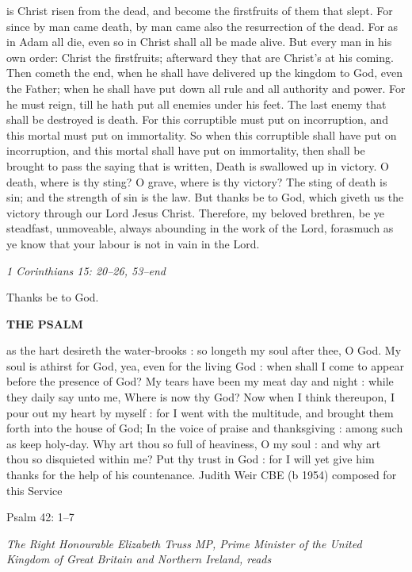  is Christ risen from the dead, and become the firstfruits of them that slept.
For since by man came death, by man came also the resurrection of the dead. For
as in Adam all die, even so in Christ shall all be made alive. But every man in his own
order: Christ the firstfruits; afterward they that are Christ’s at his coming. Then cometh
the end, when he shall have delivered up the kingdom to God, even the Father; when
he shall have put down all rule and all authority and power. For he must reign, till he
hath put all enemies under his feet. The last enemy that shall be destroyed is death. For
this corruptible must put on incorruption, and this mortal must put on immortality. So
when this corruptible shall have put on incorruption, and this mortal shall have put on
immortality, then shall be brought to pass the saying that is written, Death is swallowed
up in victory. O death, where is thy sting? O grave, where is thy victory? The sting of
death is sin; and the strength of sin is the law. But thanks be to God, which giveth us
the victory through our Lord Jesus Christ. Therefore, my beloved brethren, be ye
steadfast, unmoveable, always abounding in the work of the Lord, forasmuch as ye
know that your labour is not in vain in the Lord.

\hfill {\itshape\color{qred}1 Corinthians 15: 20–26, 53–end}

Thanks be to God.




\begin{center}
	\bfseries\color{qred} THE PSALM
\end{center}

 as the hart desireth the water-brooks : so longeth my soul after thee, O God.
My soul is athirst for God, yea, even for the living God : when shall I come to
appear before the presence of God?
My tears have been my meat day and night : while they daily say unto me, Where is
now thy God?
Now when I think thereupon, I pour out my heart by myself : for I went with the
multitude, and brought them forth into the house of God;
In the voice of praise and thanksgiving : among such as keep holy-day.
Why art thou so full of heaviness, O my soul : and why art thou so disquieted within
me?
Put thy trust in God : for I will yet give him thanks for the help of his countenance.
Judith Weir CBE (b 1954)
composed for this Service

Psalm 42: 1–7

{\color{qred}\itshape The Right Honourable Elizabeth Truss MP, Prime Minister of the United Kingdom of Great Britain
and Northern Ireland, reads
}

